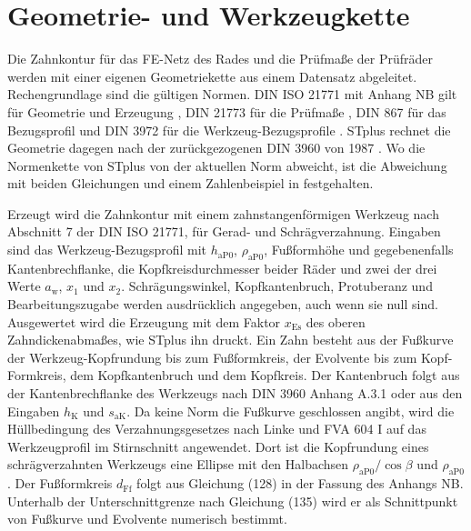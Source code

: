 \section{Geometrie- und Werkzeugkette}
\label{sec:werkzeugkette}

Die Zahnkontur für das FE-Netz des Rades und die Prüfmaße der Prüfräder werden mit einer eigenen Geometriekette aus einem Datensatz abgeleitet. Rechengrundlage sind die gültigen Normen. DIN ISO 21771 mit Anhang NB gilt für Geometrie und Erzeugung \cite{DINISO21771}, DIN 21773 für die Prüfmaße \cite{DIN21773}, DIN 867 für das Bezugsprofil \cite{DIN867} und DIN 3972 für die Werkzeug-Bezugsprofile \cite{DIN3972}. STplus rechnet die Geometrie dagegen nach der zurückgezogenen DIN 3960 von 1987 \cite{DIN3960}. Wo die Normenkette von STplus von der aktuellen Norm abweicht, ist die Abweichung mit beiden Gleichungen und einem Zahlenbeispiel in  festgehalten.

Erzeugt wird die Zahnkontur mit einem zahnstangenförmigen Werkzeug nach Abschnitt 7 der DIN ISO 21771, für Gerad- und Schrägverzahnung. Eingaben sind das Werkzeug-Bezugsprofil mit $h_{\mathrm{aP0}}$, $\rho_{\mathrm{aP0}}$, Fußformhöhe und gegebenenfalls Kantenbrechflanke, die Kopfkreisdurchmesser beider Räder und zwei der drei Werte $a_{\mathrm{w}}$, $x_1$ und $x_2$. Schrägungswinkel, Kopfkantenbruch, Protuberanz und Bearbeitungszugabe werden ausdrücklich angegeben, auch wenn sie null sind. Ausgewertet wird die Erzeugung mit dem Faktor $x_{\mathrm{Es}}$ des oberen Zahndickenabmaßes, wie STplus ihn druckt. Ein Zahn besteht aus der Fußkurve der Werkzeug-Kopfrundung bis zum Fußformkreis, der Evolvente bis zum Kopf-Formkreis, dem Kopfkantenbruch und dem Kopfkreis. Der Kantenbruch folgt aus der Kantenbrechflanke des Werkzeugs nach DIN 3960 Anhang A.3.1 \cite[S.~14]{DIN3960} oder aus den Eingaben $h_{\mathrm{K}}$ und $s_{\mathrm{aK}}$. Da keine Norm die Fußkurve geschlossen angibt, wird die Hüllbedingung des Verzahnungsgesetzes nach Linke \cite{Lin10} und FVA 604 I \cite{FVA604-I} auf das Werkzeugprofil im Stirnschnitt angewendet. Dort ist die Kopfrundung eines schrägverzahnten Werkzeugs eine Ellipse mit den Halbachsen $\rho_{\mathrm{aP0}}/\cos\beta$ und $\rho_{\mathrm{aP0}}$. Der Fußformkreis $d_{\mathrm{Ff}}$ folgt aus Gleichung (128) in der Fassung des Anhangs NB. Unterhalb der Unterschnittgrenze nach Gleichung (135) wird er als Schnittpunkt von Fußkurve und Evolvente numerisch bestimmt.

